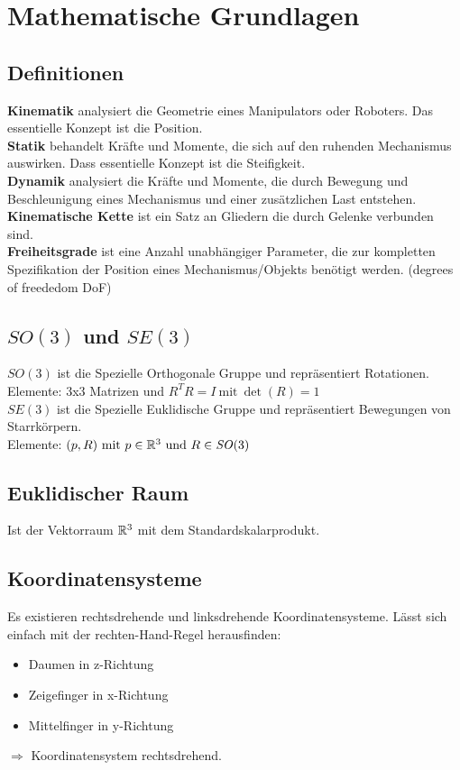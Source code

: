 

\section{Mathematische Grundlagen}

\newcommand{\SO}{\ensuremath{\mathit{SO}(3)}\xspace}
\newcommand{\SE}{\ensuremath{\mathit{SE}(3)}\xspace}

\subsection{Definitionen}
\textbf{Kinematik} analysiert die Geometrie eines Manipulators oder Roboters. Das essentielle Konzept ist die Position.\\
\textbf{Statik} behandelt Kräfte und Momente, die sich auf den ruhenden Mechanismus auswirken. Dass essentielle Konzept
ist die Steifigkeit.\\
\textbf{Dynamik} analysiert die Kräfte und Momente, die durch Bewegung und Beschleunigung eines Mechanismus und einer
zusätzlichen Last entstehen.\\
\textbf{Kinematische Kette} ist ein Satz an Gliedern die durch Gelenke verbunden sind.\\
\textbf{Freiheitsgrade} ist eine Anzahl unabhängiger Parameter, die zur kompletten Spezifikation der Position eines
Mechanismus/Objekts benötigt werden. (degrees of freededom DoF)

\subsection{\SO und \SE}
\SO ist die Spezielle Orthogonale Gruppe und repräsentiert Rotationen.\\
Elemente: 3x3 Matrizen und \(R^TR = I\ \text{mit}\ \det(R) = 1\)\\
\SE ist die Spezielle Euklidische Gruppe und repräsentiert Bewegungen von Starrkörpern.\\
Elemente: \((p, R)\ \text{mit}\ p \in \realnumbers^3\ \text{und}\ R \in \SO\)

\subsection{Euklidischer Raum}
Ist der Vektorraum \(\mathbb{R}^3\) mit dem Standardskalarprodukt.

\subsection{Koordinatensysteme}
Es existieren rechtsdrehende und linksdrehende Koordinatensysteme. Lässt sich einfach mit der rechten-Hand-Regel herausfinden:\\
\begin{itemize}
  \item Daumen in z-Richtung
  \item Zeigefinger in x-Richtung
  \item Mittelfinger in y-Richtung
\end{itemize}
\(\Rightarrow\) Koordinatensystem rechtsdrehend.\\

